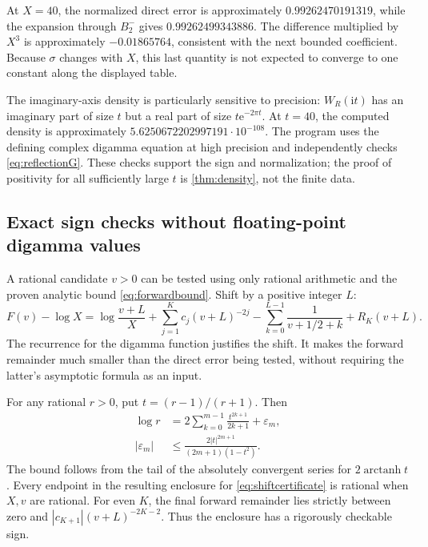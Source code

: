 \documentclass[11pt,a4paper]{article}
\theoremstyle{definition}
\numberwithin{equation}{section}
\newcommand{\ii}{\mathrm{i}}
\newcommand{\ee}{\mathrm{e}}
\begin{document}
At $X=40$, the normalized direct error is approximately
$0.99262470191319$, while the expansion through $B_2^-$ gives
$0.99262499343886$. The difference multiplied by $X^3$ is approximately
$-0.01865764$, consistent with the next bounded coefficient. Because
$\sigma$ changes with $X$, this last quantity is not expected to converge
to one constant along the displayed table.

The imaginary-axis density is particularly sensitive to precision:
$W_R(\ii t)$ has an imaginary part of size $t$ but a real part of size
$t\ee^{-2\pi t}$. At $t=40$, the computed density is approximately
$5.6250672202997191\cdot10^{-108}$. The program uses the defining
complex digamma equation at high precision and independently checks
\eqref{eq:reflectionG}. These checks support the sign and normalization;
the proof of positivity for all sufficiently large $t$ is
\cref{thm:density}, not the finite data.

\subsection{Exact sign checks without floating-point digamma values}
A rational candidate $v>0$ can be tested using only rational arithmetic
and the proven analytic bound \eqref{eq:forwardbound}. Shift by a positive
integer $L$:
\begin{equation}
 F(v)-\log X=\log\frac{v+L}{X}
  +\sum_{j=1}^K c_j(v+L)^{-2j}
  -\sum_{k=0}^{L-1}\frac1{v+1/2+k}+R_K(v+L).
 \label{eq:shiftcertificate}
\end{equation}
The recurrence for the digamma function justifies the shift. It makes the
forward remainder much smaller than the direct error being tested, without
requiring the latter's asymptotic formula as an input.

For any rational $r>0$, put $t=(r-1)/(r+1)$. Then
\begin{align}
 \log r&=2\sum_{k=0}^{m-1}\frac{t^{2k+1}}{2k+1}+\varepsilon_m,
     \label{eq:logcert}\\
 |\varepsilon_m|&\le
     \frac{2|t|^{2m+1}}{(2m+1)(1-t^2)}.
     \label{eq:logcertbound}
\end{align}
The bound follows from the tail of the absolutely convergent series for
$2\operatorname{arctanh}t$. Every endpoint in the resulting enclosure
for \eqref{eq:shiftcertificate} is rational when $X,v$ are rational.
For even $K$, the final forward remainder lies strictly between zero and
$|c_{K+1}|(v+L)^{-2K-2}$. Thus the enclosure has a rigorously checkable sign.
\end{document}
